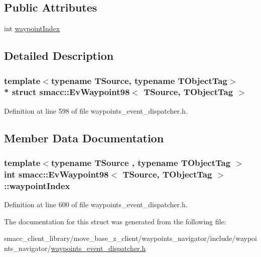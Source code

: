 \subsection*{Public Attributes}
\begin{DoxyCompactItemize}
\item 
int \hyperlink{structsmacc_1_1EvWaypoint98_a30265e5ef7183500f671cde6f4538941}{waypoint\+Index}
\end{DoxyCompactItemize}


\subsection{Detailed Description}
\subsubsection*{template$<$typename T\+Source, typename T\+Object\+Tag$>$\\*
struct smacc\+::\+Ev\+Waypoint98$<$ T\+Source, T\+Object\+Tag $>$}



Definition at line 598 of file waypoints\+\_\+event\+\_\+dispatcher.\+h.



\subsection{Member Data Documentation}
\subsubsection[{\texorpdfstring{waypoint\+Index}{waypointIndex}}]{\setlength{\rightskip}{0pt plus 5cm}template$<$typename T\+Source , typename T\+Object\+Tag $>$ int {\bf smacc\+::\+Ev\+Waypoint98}$<$ T\+Source, T\+Object\+Tag $>$\+::waypoint\+Index}\hypertarget{structsmacc_1_1EvWaypoint98_a30265e5ef7183500f671cde6f4538941}{}\label{structsmacc_1_1EvWaypoint98_a30265e5ef7183500f671cde6f4538941}


Definition at line 600 of file waypoints\+\_\+event\+\_\+dispatcher.\+h.



The documentation for this struct was generated from the following file\+:\begin{DoxyCompactItemize}
\item 
smacc\+\_\+client\+\_\+library/move\+\_\+base\+\_\+z\+\_\+client/waypoints\+\_\+navigator/include/waypoints\+\_\+navigator/\hyperlink{waypoints__event__dispatcher_8h}{waypoints\+\_\+event\+\_\+dispatcher.\+h}\end{DoxyCompactItemize}
